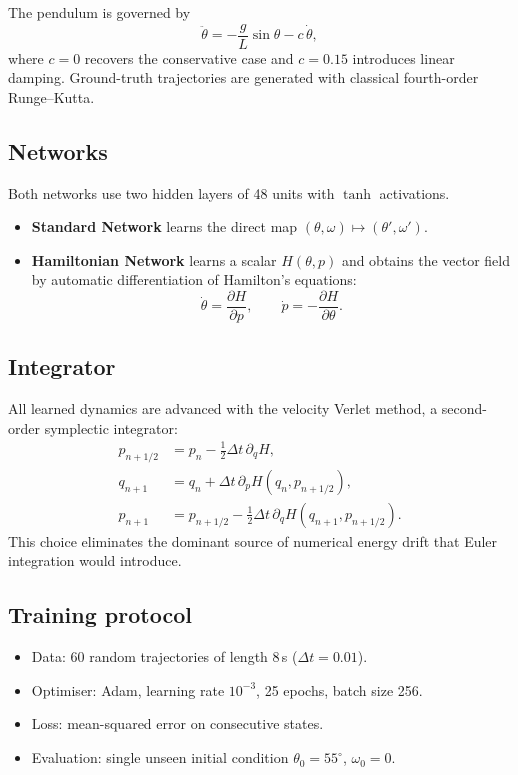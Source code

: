 \documentclass[11pt,a4paper]{article}
\begin{document}
The pendulum is governed by
\begin{equation}
  \ddot{\theta} = -\frac{g}{L}\sin\theta - c\,\dot{\theta},
\end{equation}
where \(c=0\) recovers the conservative case and \(c=0.15\) introduces linear damping. Ground-truth trajectories are generated with classical fourth-order Runge--Kutta.

\subsection{Networks}

Both networks use two hidden layers of 48 units with \(\tanh\) activations.

\begin{itemize}
  \item \textbf{Standard Network} learns the direct map \((\theta,\omega)\mapsto(\theta',\omega')\).
  \item \textbf{Hamiltonian Network} learns a scalar \(H(\theta,p)\) and obtains the vector field by automatic differentiation of Hamilton's equations:
  \begin{equation}
    \dot{\theta}=\frac{\partial H}{\partial p},\qquad
    \dot{p}=-\frac{\partial H}{\partial\theta}.
  \end{equation}
\end{itemize}

\subsection{Integrator}

All learned dynamics are advanced with the velocity Verlet method, a second-order symplectic integrator:
\begin{align}
  p_{n+1/2} &= p_n - \tfrac12\Delta t\,\partial_q H, \\
  q_{n+1}   &= q_n + \Delta t\,\partial_p H(q_n,p_{n+1/2}), \\
  p_{n+1}   &= p_{n+1/2} - \tfrac12\Delta t\,\partial_q H(q_{n+1},p_{n+1/2}).
\end{align}
This choice eliminates the dominant source of numerical energy drift that Euler integration would introduce.

\subsection{Training protocol}

\begin{itemize}
  \item Data: 60 random trajectories of length 8\,s (\(\Delta t=0.01\)).
  \item Optimiser: Adam, learning rate \(10^{-3}\), 25 epochs, batch size 256.
  \item Loss: mean-squared error on consecutive states.
  \item Evaluation: single unseen initial condition \(\theta_0=55^\circ\), \(\omega_0=0\).
\end{itemize}
\end{document}
